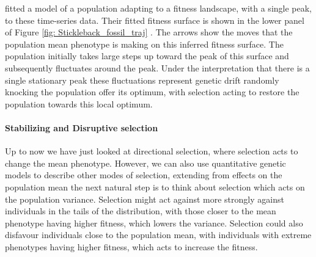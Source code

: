 \citet{hunt2008evolution} fitted a model of a population adapting to a
fitness landscape, with a single peak, to these time-series data. Their fitted fitness
surface is shown in the lower panel of Figure \ref{fig:
  Stickleback_fossil_traj} . The arrows show the moves that the
population mean phenotype is making on this inferred fitness
surface. The population initially takes large steps up toward the peak
of this surface and subsequently fluctuates around the peak. Under the
interpretation that there is a single stationary peak these
fluctuations represent genetic drift randomly knocking the population
offer its optimum, with selection acting to restore
the population towards this local optimum.



 \paragraph{Stabilizing and Disruptive selection}

Up to now we have just looked at directional selection, where
selection acts to change the mean phenotype. However, we
can also use quantitative genetic models to describe other modes of
selection, extending from effects on the population mean the next
natural step is to think about selection which acts on the
population variance. Selection might act against more strongly against
individuals in the tails of the distribution, with those closer
to the mean phenotype having higher fitness, which lowers the
variance. Selection could also disfavour individuals close to the
population mean, with individuals with extreme phenotypes having
higher fitness, which acts to increase the fitness. 

